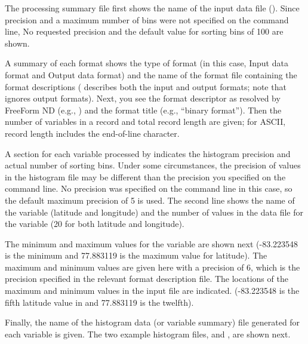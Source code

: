 The processing summary file  first shows the name of
the input data file ().  Since precision and a
maximum number of bins were not specified on the command line, No
requested precision and the default value for sorting bins of 100 are
shown.

A summary of each format shows the type of format (in this case, Input
data format and Output data format) and the name of the format file
containing the format descriptions ( describes both
the input and output formats; note that  ignores output
formats). Next, you see the format descriptor as resolved by FreeForm
ND (e.g., ) and the format title (e.g.,
``binary format''). Then the number of variables in a record and total
record length are given; for ASCII, record length includes the
end-of-line character.

A section for each variable processed by  indicates the
histogram precision and actual number of sorting bins. Under some
circumstances, the precision of values in the histogram file may be
different than the precision you specified on the command line. No
precision was specified on the command line in this case, so the
default maximum precision of 5 is used. The second line shows the name
of the variable (latitude and longitude) and the number of values in
the data file for the variable (20 for both latitude and longitude).

The minimum and maximum values for the variable are shown next
(-83.223548 is the minimum and 77.883119 is the maximum value for
latitude). The maximum and minimum values are given here with a
precision of 6, which is the precision specified in the relevant
format description file. The locations of the maximum and minimum
values in the input file are indicated. (-83.223548 is the fifth
latitude value in  and 77.883119 is the twelfth).

Finally, the name of the histogram data (or variable summary) file
generated for each variable is given. The two example histogram files,
 and , are shown next.


